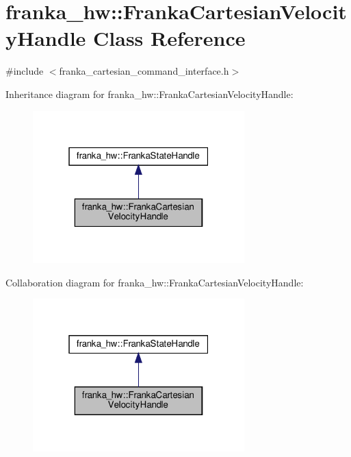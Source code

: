 \hypertarget{classfranka__hw_1_1_franka_cartesian_velocity_handle}{}\section{franka\+\_\+hw\+:\+:Franka\+Cartesian\+Velocity\+Handle Class Reference}
\label{classfranka__hw_1_1_franka_cartesian_velocity_handle}


{\ttfamily \#include $<$franka\+\_\+cartesian\+\_\+command\+\_\+interface.\+h$>$}



Inheritance diagram for franka\+\_\+hw\+:\+:Franka\+Cartesian\+Velocity\+Handle\+:
\nopagebreak
\begin{figure}[H]
\begin{center}
\leavevmode
\includegraphics[width=232pt]{classfranka__hw_1_1_franka_cartesian_velocity_handle__inherit__graph}
\end{center}
\end{figure}


Collaboration diagram for franka\+\_\+hw\+:\+:Franka\+Cartesian\+Velocity\+Handle\+:
\nopagebreak
\begin{figure}[H]
\begin{center}
\leavevmode
\includegraphics[width=232pt]{classfranka__hw_1_1_franka_cartesian_velocity_handle__coll__graph}
\end{center}
\end{figure}
